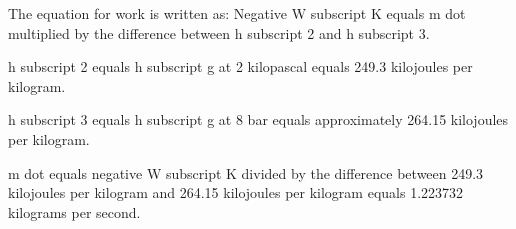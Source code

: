 The equation for work is written as:  
Negative W subscript K equals m dot multiplied by the difference between h subscript 2 and h subscript 3.  

h subscript 2 equals h subscript g at 2 kilopascal equals 249.3 kilojoules per kilogram.  

h subscript 3 equals h subscript g at 8 bar equals approximately 264.15 kilojoules per kilogram.  

m dot equals negative W subscript K divided by the difference between 249.3 kilojoules per kilogram and 264.15 kilojoules per kilogram equals 1.223732 kilograms per second.